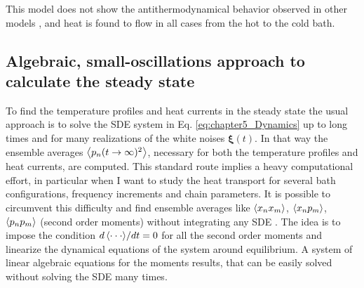 This model does not show the antithermodynamical behavior  observed in other models
\cite{De-Chiara2018,Levy2014}, and heat is found to flow in all cases from the hot to the
cold bath.
%
%
%
\subsection{Algebraic, small-oscillations approach to calculate the steady state\label{sec:chapter5_steadyState}}
%
%
%
%
To find the temperature profiles and heat currents in the steady state the usual approach is to solve the SDE system in Eq. \eqref{eq:chapter5_Dynamics} up to long times  and for many realizations of the white noises $\bm\xi (t)$. In that way the ensemble averages $\expval{p_n(t \to \infty)^2}$, necessary for both the temperature profiles and heat currents, are computed. This standard route implies a heavy computational effort, in particular  when I want to study the heat transport for several bath configurations, frequency increments and chain parameters. It is possible to circumvent this difficulty and find ensemble averages like $\expval{x_n x_m}$, $\expval{x_n p_m}$, $\expval{p_n p_m}$ (second order moments) without integrating any SDE \cite{Sarkka2019,Rieder1967,Casher1971}. The idea is to impose the condition ${d\expval{\cdot\cdot\cdot}}/{dt} = 0$ for all the second order moments and linearize the dynamical equations of the system around equilibrium.
A system of linear algebraic equations for the moments results, that can be easily solved without solving the SDE many times.

